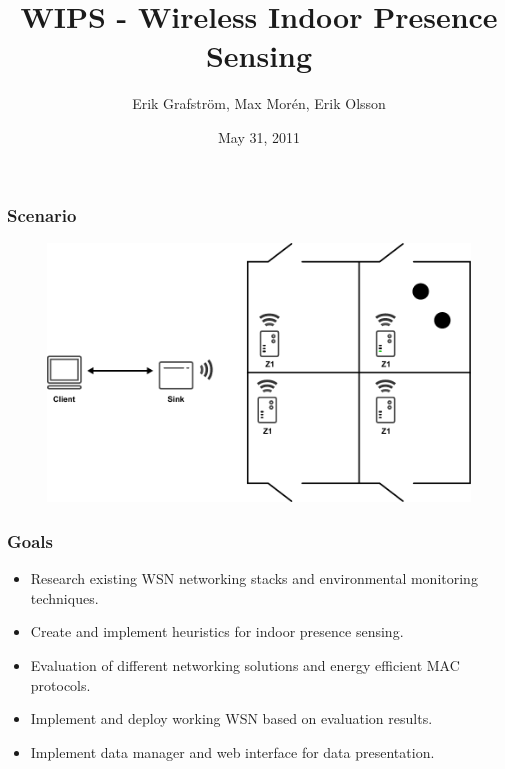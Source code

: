 \documentclass{beamer}
\title{WIPS - Wireless Indoor Presence Sensing}
\author{Erik Grafström, Max Morén, Erik Olsson}
\date{May 31, 2011}
\begin{document}
\begin{frame}
	\titlepage
\end{frame}

\begin{frame}
\frametitle{Scenario}
	
	\begin{figure}
		\includegraphics[width=\textwidth]{images/scenario.pdf}
		\caption{}
		\label{fig:scenario}
	\end{figure}
	
\end{frame}

\begin{frame}
\frametitle{Goals}

	\begin{block}

		\begin{itemize}

		\item
		
		Research existing WSN networking stacks and environmental monitoring techniques.
		\item
	Create and implement heuristics for indoor presence sensing.

		\item
	Evaluation of different networking solutions and energy efficient MAC protocols.
		\item
Implement and deploy working WSN based on evaluation results.
		\item
Implement data manager and web interface for data presentation.
		
		\end{itemize}

	\end{block}

\end{frame}
\end{document}
